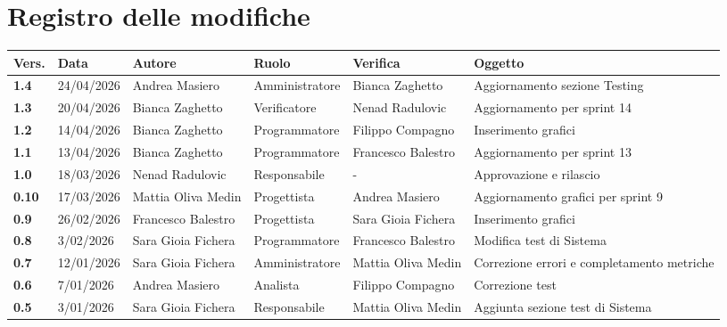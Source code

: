 \documentclass[a4paper,12pt]{article}
\begin{document}
    

    \newpage
    \section*{Registro delle modifiche}
    \begin{xltabular}{\textwidth}{|l|l|X|l|X|X|}
    \hline
    \textbf{Vers.} & \textbf{Data} & \textbf{Autore} & \textbf{Ruolo} & \textbf{Verifica} & \textbf{Oggetto} \\
    \hline
    \endhead
    \endfoot
    \hline
    \endlastfoot
                \textbf{1.4} & 24/04/2026 & Andrea Masiero & Amministratore & Bianca Zaghetto & Aggiornamento sezione Testing\\
                \hline
                \textbf{1.3} & 20/04/2026 & Bianca Zaghetto & Verificatore & Nenad Radulovic & Aggiornamento per sprint 14\\
                \hline
                \textbf{1.2} & 14/04/2026 & Bianca Zaghetto & Programmatore & Filippo Compagno & Inserimento grafici\\
                \hline
                \textbf{1.1} & 13/04/2026 & Bianca Zaghetto & Programmatore & Francesco Balestro & Aggiornamento per sprint 13\\
                \hline
                \textbf{1.0} & 18/03/2026 & Nenad Radulovic & Responsabile & - & Approvazione e rilascio\\
                \hline
                \textbf{0.10} & 17/03/2026 & Mattia Oliva Medin & Progettista & Andrea Masiero & Aggiornamento grafici per sprint 9\\
                \hline
                \textbf{0.9} & 26/02/2026 & Francesco Balestro & Progettista & Sara Gioia Fichera & Inserimento grafici\\
                \hline
                \textbf{0.8} & 3/02/2026 & Sara Gioia Fichera & Programmatore & Francesco Balestro & Modifica test di Sistema\\
                \hline
                \textbf{0.7} & 12/01/2026 & Sara Gioia Fichera & Amministratore & Mattia Oliva Medin & Correzione errori e completamento metriche \\
                \hline
                \textbf{0.6} & 7/01/2026 & Andrea Masiero & Analista & Filippo Compagno & Correzione test \\
                \hline
                \textbf{0.5} & 3/01/2026 & Sara Gioia Fichera & Responsabile & Mattia Oliva Medin & Aggiunta sezione test di Sistema \\

\end{xltabular}
\end{document}
